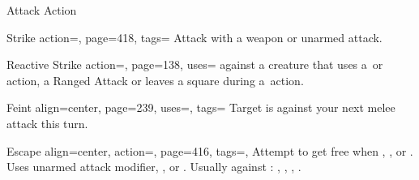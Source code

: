 \renewcommand{\PageBottomReferences}{%
    \hfill PC2 = Player Core 2
    \hfill GMC = GM Core\\
    \hfill SoM = Secrets of Magic
    \hfill TV = Treasure Vault
}
\setlength{\parindent}{0mm}%
\begin{PageBackLandscape}%
    \begin{TablesHalf}{\backTableHeight}%
        \begin{Table}{Attack Action}
            \begin{entry}{Strike}{%
                action=,
                page=418,
                tags=\Attack
            }
                Attack with a weapon or unarmed attack. \hfill
            \end{entry}
            \begin{entry}{Reactive Strike}{%
                action=,
                page=138,
                uses=\Feat
            }
                 against a creature that uses a \Manipulate\,or \Move\,action, a Ranged Attack or leaves a square during a \Move\,action.\\
                \hfill {}
            \end{entry}
            \begin{entry}{Feint}{%
                align=center,
                page=239,
                uses={\DeceptionPerception[tags={T}]},
                tags=\Mental
            }
                Target is \OffGuard against your next melee attack this turn. \\
                \hfill{}
            \end{entry}
            \begin{entry}{Escape}{%
                align=center,
                action=,
                page=416,
                tags=\Attack,
            }%
                Attempt to get free when \Grabbed, \Immobilized, or \Restrained.  \hfill
                \hfill
                \\
                {Uses unarmed attack modifier, \AcrobaticsT, or \AthleticsT. \hfill Usually against
                \DC:  ,  ,  ,
                     .}

\end{entry}
\end{Table}
\end{TablesHalf}
\end{PageBackLandscape}
